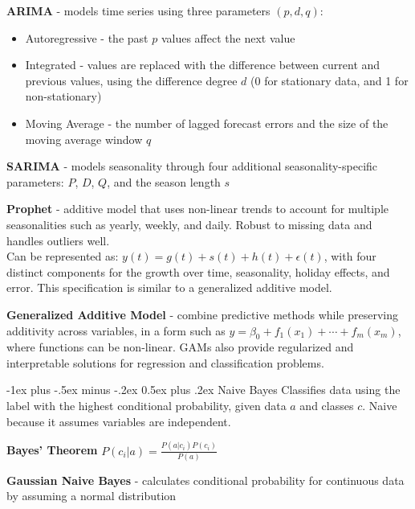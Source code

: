 \documentclass[10pt,landscape]{article}
\makeatletter
\renewcommand{\section}{\@startsection{section}{1}{0mm}%
                                {-1ex plus -.5ex minus -.2ex}%
                                {0.5ex plus .2ex}%
                                {\normalfont\large\bfseries}}
\makeatother
\begin{document}
\begin{multicols}{3}
        \textbf{ARIMA} - models time series using three parameters $(p,d,q)$:
        \begin{itemize}[label={--},leftmargin=4mm]
            \itemsep -.4mm
            \item Autoregressive - the past $p$ values affect the next value

            \item Integrated - values are replaced with the difference between current and previous values, using the difference degree $d$ (0 for stationary data, and 1 for non-stationary)

            \item Moving Average - the number of lagged forecast errors and the size of the moving average window $q$
        \end{itemize}

        \textbf{SARIMA} - models seasonality through four additional seasonality-specific parameters: $P$, $D$, $Q$, and the season length $s$
        \smallskip

        \textbf{Prophet} - additive model that uses non-linear trends to account for multiple seasonalities such as yearly, weekly, and daily. Robust to missing data and handles outliers well.\\ Can be represented as: $y(t) = g(t) + s(t) + h(t) + \epsilon(t)$, with four distinct components for the growth over time, seasonality, holiday effects, and error. This specification is similar to a generalized additive model.
        \smallskip

        \textbf{Generalized Additive Model} - combine predictive methods while preserving additivity across variables, in a form such as
    $y = \beta_0 + f_1(x_1) + \cdots + f_m(x_m)$, where functions can be non-linear. GAMs also provide regularized and interpretable solutions for regression and classification problems.

        \section{Naive Bayes}
        Classifies data using the label with the highest conditional probability, given data $a$ and classes $c$. Naive because it assumes variables are independent.

        \textbf{Bayes' Theorem} $ P({c_i}|{a})  = \frac{P({a}|{c_i})P({c_i})}{P({a})}$

        \textbf{Gaussian Naive Bayes} - calculates conditional probability for continuous data by assuming a normal distribution


\end{multicols}
\end{document}

